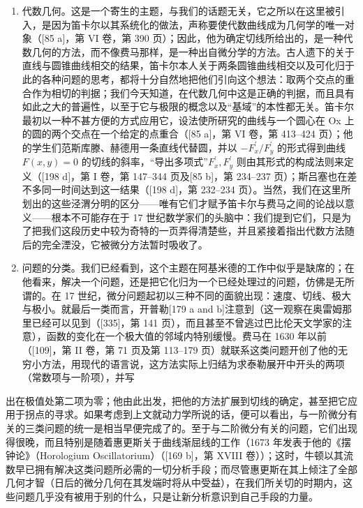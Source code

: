 \begin{enumerate}
\def\labelenumi{\Alph{enumi})}
\setcounter{enumi}{2}
\item
  代数几何。这是一个寄生的主题，与我们的话题无关，它之所以在这里被引入，是因为笛卡尔以其系统化的做法，声称要使代数曲线成为几何学的唯一对象（{[}85 a{]}，第 VI 卷，第 390 页）；因此，他为确定切线所给出的，是一种代数几何的方法，而不像费马那样，是一种出自微分学的方法。古人遗下的关于直线与圆锥曲线相交的结果，笛卡尔本人关于两条圆锥曲线相交以及可化归于此的各种问题的思考，都将十分自然地把他们引向这个想法：取两个交点的重合作为相切的判据；我们今天知道，在代数几何中这是正确的判据，而且具有如此之大的普遍性，以至于它与极限的概念以及“基域”的本性都无关。笛卡尔最初以一种不甚方便的方式应用它，设法使所研究的曲线与一个圆心在 Ox 上的圆的两个交点在一个给定的点重合（{[}85 a{]}，第 VI 卷，第 413–424 页）；他的学生们范斯库滕、赫德用一条直线代替圆，并以 \(-F_{x}^{\prime}/F_{y}^{\prime}\) 的形式得到曲线 \(F(x,y)=0\) 的切线的斜率，“导出多项式”\(F_{x}^{\prime}, F_{y}^{\prime}\) 则由其形式的构成法则来定义（{[}198 d{]}，第 I 卷，第 147–344 页及{[}85 b{]}，第 234–237 页）；斯吕塞也在差不多同一时间达到这一结果（{[}198 d{]}，第 232–234 页）。当然，我们在这里所划出的这些泾渭分明的区分——唯有它们才赋予笛卡尔与费马之间的论战以意义——根本不可能存在于 17 世纪数学家们的头脑中：我们提到它们，只是为了把我们这段历史中较为奇特的一页弄得清楚些，并且紧接着指出代数方法随后的完全湮没，它被微分方法暂时吸收了。
\item
  问题的分类。我们已经看到，这个主题在阿基米德的工作中似乎是缺席的；在他看来，解决一个问题，还是把它化归为一个已经处理过的问题，仿佛是无所谓的。在 17 世纪，微分问题起初以三种不同的面貌出现：速度、切线、极大与极小。就最后一类而言，开普勒{[}179 a and b{]}注意到（这一观察在奥雷姆那里已经可以见到（{[}335{]}，第 141 页），而且甚至不曾逃过巴比伦天文学家的注意），函数的变化在一个极大值的邻域内特别缓慢。费马在 1630 年以前（{[}109{]}，第 II 卷，第 71 页及第 113–179 页）就联系这类问题开创了他的无穷小方法，用现代的语言说，这方法实际上归结为求泰勒展开中开头的两项（常数项与一阶项），并写
\end{enumerate}

出在极值处第二项为零；他由此出发，把他的方法扩展到切线的确定，甚至把它应用于拐点的寻求。如果考虑到上文就动力学所说的话，便可以看出，与一阶微分有关的三类问题的统一是相当早便完成了的。至于与二阶微分有关的问题，它们出现得很晚，而且特别是随着惠更斯关于曲线渐屈线的工作（1673 年发表于他的《摆钟论》（Horologium Oscillatorium）（{[}169 b{]}，第 XVIII 卷））；这时，牛顿以其流数早已拥有解决这类问题所必需的一切分析手段；而尽管惠更斯在其上倾注了全部几何才智（日后的微分几何在其发端时将从中受益），在我们所关切的时期内，这些问题几乎没有被用于别的什么，只是让新分析意识到自己手段的力量。

